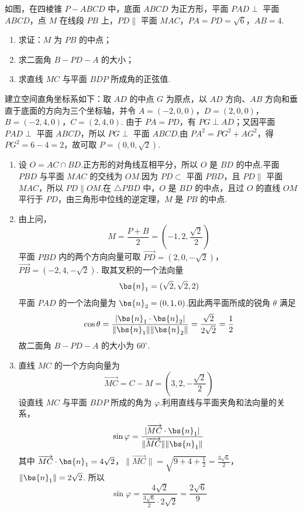 \begin{problem}
如图，在四棱锥 \(P-ABCD\) 中，底面 \(ABCD\) 为正方形，平面 \(PAD\perp\) 平面 \(ABCD\)，点 \(M\) 在线段 \(PB\) 上，\(PD\parallel\) 平面 \(MAC\)，\(PA=PD=\sqrt6\)，\(AB=4\).

\begin{enumerate}
\item 求证：\(M\) 为 \(PB\) 的中点；
\item 求二面角 \(B-PD-A\) 的大小；
\item 求直线 \(MC\) 与平面 \(BDP\) 所成角的正弦值.
\end{enumerate}

\end{problem}

\begin{solution}
建立空间直角坐标系如下：取 \(AD\) 的中点 \(G\) 为原点，以 \(AD\) 方向、\(AB\) 方向和垂直于底面的方向为三个坐标轴，并令
\(A=(-2,0,0)\)，\(D=(2,0,0)\)，\(B=(-2,4,0)\)，\(C=(2,4,0)\).
由于 \(PA=PD\)，有 \(PG\perp AD\)；又因平面 \(PAD\perp\) 平面 \(ABCD\)，所以 \(PG\perp\) 平面 \(ABCD\).由 \(PA^2=PG^2+AG^2\)，得 \(PG^2=6-4=2\)，故可取 \(P=(0,0,\sqrt2)\).

\begin{enumerate}
\item 设 \(O=AC\cap BD\).正方形的对角线互相平分，所以 \(O\) 是 \(BD\) 的中点.平面 \(PBD\) 与平面 \(MAC\) 的交线为 \(OM\).因为 \(PD\subset\) 平面 \(PBD\)，且 \(PD\parallel\) 平面 \(MAC\)，所以 \(PD\parallel OM\).在 \(\triangle PBD\) 中，\(O\) 是 \(BD\) 的中点，且过 \(O\) 的直线 \(OM\) 平行于 \(PD\)，由三角形中位线的逆定理，\(M\) 是 \(PB\) 的中点.

\item 由上问，
\[
M=\frac{P+B}{2}=\left(-1,2,\frac{\sqrt2}{2}\right)
\]
平面 \(PBD\) 内的两个方向向量可取
\(\overrightarrow{PD}=(2,0,-\sqrt2)\)，\(\overrightarrow{PB}=(-2,4,-\sqrt2)\).
取其叉积的一个法向量
\[
\bs{n}_1=(\sqrt2,\sqrt2,2)
\]
平面 \(PAD\) 的一个法向量为 \(\bs{n}_2=(0,1,0)\).因此两平面所成的锐角 \(\theta\) 满足
\[
\cos\theta=\frac{|\bs{n}_1\cdot\bs{n}_2|}{\lVert\bs{n}_1\rVert\lVert\bs{n}_2\rVert}
=\frac{\sqrt2}{2\sqrt2}=\frac12
\]
故二面角 \(B-PD-A\) 的大小为 \(60^\circ\).

\item 直线 \(MC\) 的一个方向向量为
\[
\overrightarrow{MC}=C-M=\left(3,2,-\frac{\sqrt2}{2}\right)
\]
设直线 \(MC\) 与平面 \(BDP\) 所成的角为 \(\varphi\).利用直线与平面夹角和法向量的关系，
\[
\sin\varphi=\frac{|\overrightarrow{MC}\cdot\bs{n}_1|}{\lVert\overrightarrow{MC}\rVert\lVert\bs{n}_1\rVert}
\]
其中
\(\overrightarrow{MC}\cdot\bs{n}_1=4\sqrt2\)，\(\lVert\overrightarrow{MC}\rVert=\sqrt{9+4+\frac12}=\frac{3\sqrt6}{2}\)，\(\lVert\bs{n}_1\rVert=2\sqrt2\).
所以
\[
\sin\varphi=\frac{4\sqrt2}{\frac{3\sqrt6}{2}\cdot2\sqrt2}=\frac{2\sqrt6}{9}
\]
\end{enumerate}
\end{solution}

